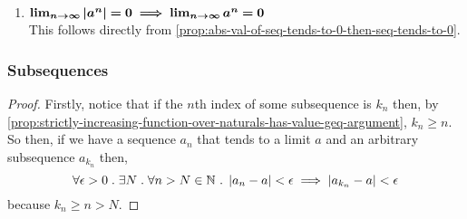 \documentclass[../MathsNotesBase.tex]{subfiles}
\begin{document}
{\begin{exe}
{\begin{enumerate}
					\bigskip
					\item{${\bm{ \lim_{n \to \infty} \left\lvert a^n\right\rvert = 0 \implies \lim_{n \to \infty} a^n = 0 }}$}\\
					
					This follows directly from \autoref{prop:abs-val-of-seq-tends-to-0-then-seq-tends-to-0}.
				\end{enumerate}
			}\label{ex:geom_prog_common_ratio_less_than_one_tends_to_zero}
		\end{exe}





\pagebreak


		\subsubsection{Subsequences}
		\bigskip
		\label{def:subsequence}
	
		\medskip
		\begin{proof}
			Firstly, notice that if the $n$th index of some subsequence is $k_n$ then, by \autoref{prop:strictly-increasing-function-over-naturals-has-value-geq-argument}, $k_n \geq n$. So then, if we have a sequence $a_n$ that tends to a limit $a$ and an arbitrary subsequence $a_{k_n}$ then,
			\[ \forall \epsilon > 0 \;.\; \exists N \;.\; \forall n > N \in \mathbb{N}^{} \;.\; \left\lvert a_n - a\right\rvert < \epsilon \implies \left\lvert a_{k_n} - a\right\rvert < \epsilon \]
			because ${ k_n \geq n > N }$.
		\end{proof}
	
}
\end{document}
